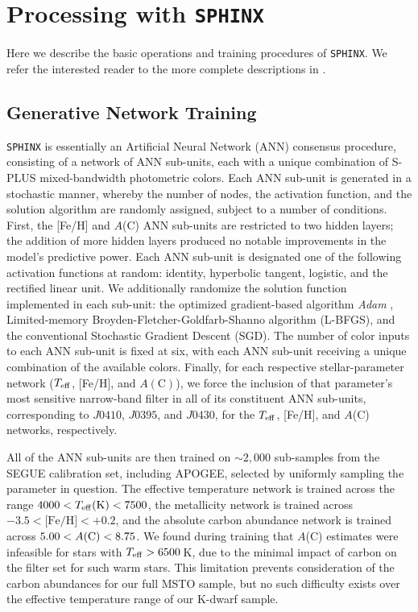 \documentclass[twocolumn,trackchanges]{aastex63}
\begin{document}
\section{Processing with \texttt{SPHINX}}\label{section:SPHINX}

Here we describe the basic operations and training procedures of \texttt{SPHINX}. We refer the interested reader to the more complete descriptions in \citet{Whitten:2019a}.

\subsection{Generative Network Training}

\texttt{SPHINX} is essentially an Artificial Neural Network (ANN) consensus procedure, consisting of a network of ANN sub-units, each with a unique combination of S-PLUS mixed-bandwidth photometric colors. Each ANN sub-unit is generated in a stochastic manner, whereby the number of nodes, the activation function, and the solution algorithm are randomly assigned, subject to a number of conditions. First, the [Fe/H] and $A$(C) ANN sub-units are restricted to two hidden layers; the addition of more hidden layers produced no notable improvements in the model's predictive power. Each ANN sub-unit is designated one of the following activation functions at random: identity, hyperbolic tangent, logistic, and the rectified linear unit. We additionally randomize the solution function implemented in each sub-unit: the optimized gradient-based algorithm \textit{Adam} \citep{ADAM}, Limited-memory Broyden-Fletcher-Goldfarb-Shanno algorithm (L-BFGS), and the conventional Stochastic Gradient Descent (SGD).  The number of color inputs to each ANN sub-unit is fixed at six, with each ANN sub-unit receiving a unique combination of the available colors. Finally, for each respective stellar-parameter network ($T_{\rm eff}$, [Fe/H], and $A(\textrm{C})$), we force the inclusion of that parameter's most sensitive narrow-band filter in all of its constituent ANN sub-units, corresponding to $J0410$, $J0395$, and $J0430$, for the $T_{\rm eff}$, [Fe/H], and $A$(C) networks, respectively.

All of the ANN sub-units are then trained on $\sim2,000$ sub-samples from the SEGUE calibration set, including APOGEE, selected by uniformly sampling the parameter in question. The effective temperature network is trained across the range $4000 < T_{\rm eff} \textrm{(K)} < 7500$, the metallicity network is trained across $-3.5 < \textrm{[Fe/H]} < +0.2$, and the absolute carbon abundance network is trained across $5.00 < A{\rm (C)} < 8.75$. We found during training that $A$(C) estimates were infeasible for stars with $T_{\rm eff} > 6500$\,K, due to the minimal impact of carbon on the filter set for such warm stars. This limitation  prevents consideration of the carbon abundances for our full MSTO sample, but no such difficulty exists over the effective temperature range of our K-dwarf sample.
\end{document}
